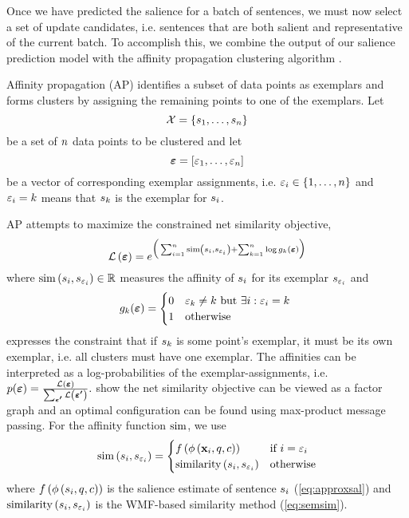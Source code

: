 Once we have predicted the salience for a batch of sentences, we must now
select a set of update candidates, i.e. sentences that are both salient and
representative of the current batch. To accomplish this, we combine the output
of our salience prediction model with the affinity propagation clustering
algorithm \citep{frey2007}.

Affinity propagation (AP)  identifies a subset of data points as exemplars and
forms clusters by assigning the remaining points to one of the exemplars.  Let
\[
    \mathcal{X} = \left\{s_1,\ldots,s_{n} \right\}
\]
be a set of $n$ data points to be clustered and let 
\[
    \boldsymbol{\varepsilon} = \left[\varepsilon_1,\ldots,\varepsilon_{n} \right]
\]
be a vector of corresponding exemplar assignments, i.e.  $\varepsilon_i \in
\{1,\ldots,n\}$ and $\varepsilon_i = k$ means that $s_k$ is the
exemplar for $s_i$.

AP attempts to maximize the constrained net similarity objective,
\[ \mathcal{L}\left(\boldsymbol{\varepsilon}\right) = e^{\Big(
    \sum_{i=1}^{n} \operatorname{sim}\left(s_i,s_{\varepsilon_i}\right) 
    + \sum_{k=1}^{n} \log g_k(\boldsymbol{\varepsilon}) 
\Big)}
\]
where $\operatorname{sim}\left(s_i, s_{\varepsilon_i}\right) \in \mathbb{R}$ measures
the affinity of $s_i$ for its exemplar $s_{\varepsilon_i}$ and 
\[
    g_k(\boldsymbol{\varepsilon}) = \begin{cases} 
    0 & \textrm{$\varepsilon_k \ne k$ but $\exists i: \varepsilon_i = k$ } \\ 
    1 & \textrm{otherwise}      \end{cases}
\] 
expresses the constraint that if $s_k$ is some point's exemplar, it must
be its own exemplar, i.e. all clusters must have one exemplar. The affinities
can be interpreted as a log-probabilities of the exemplar-assignments, i.e.
$p(\boldsymbol{\varepsilon}) = \frac{\mathcal{L}\left(\boldsymbol{\varepsilon}\right)}{ \sum_{\boldsymbol{\boldsymbol{\varepsilon}^\prime }
} \mathcal{L}\left(\boldsymbol{\boldsymbol{\varepsilon}^\prime }\right) }.$ \cite{frey2007} show the net
similarity objective can be viewed as a factor graph and an optimal
configuration can be found using max-product message passing.  For the affinity
function $\operatorname{sim}$, we use
\[ 
    \operatorname{sim}\left(s_i, s_{\varepsilon_i}\right) = \begin{cases}
        f\left(\phi\left(\mathbf{x}_i,q,c\right)\right) & 
            \textrm{if $i = \varepsilon_i$ }\\
         \operatorname{similarity}\left(s_i,s_{\varepsilon_i}\right) & \textrm{otherwise}
\end{cases}
\]
where $f\left(\phi\left(s_i,q,c\right)\right)$ is the salience estimate of
sentence $s_i$ (\autoref{eq:approxsal}) and $\operatorname{similarity}\left(s_i,
s_{\varepsilon_i}\right)$ is the WMF-based similarity method
(\autoref{eq:semsim}).

